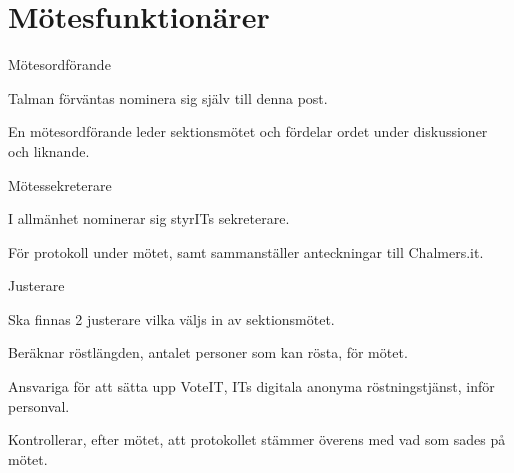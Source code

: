 \documentclass[11pt, noincludeaddress]{classes/cthit}
\let\tempone\itemize
\let\temptwo\enditemize
\renewenvironment{itemize}{\tempone\addtolength{\itemsep}{-0.3\baselineskip}}{\temptwo}
\begin{document}
\section{Mötesfunktionärer}
\begin{itemize}
    \item Mötesordförande
    \begin{itemize}
        \item Talman förväntas nominera sig själv till denna post.
        \item En mötesordförande leder sektionsmötet och fördelar ordet under diskussioner och liknande. 
    \end{itemize}
    \item Mötessekreterare
    \begin{itemize}
        \item I allmänhet nominerar sig styrITs sekreterare.
        \item För protokoll under mötet, samt sammanställer anteckningar till Chalmers.it.
    \end{itemize}
    \item Justerare
    \begin{itemize}
        \item Ska finnas 2 justerare vilka väljs in av sektionsmötet.
        \item Beräknar röstlängden, antalet personer som kan rösta, för mötet.
        \item Ansvariga för att sätta upp VoteIT, ITs digitala anonyma röstningstjänst, inför personval.
        \item Kontrollerar, efter mötet, att protokollet stämmer överens med vad som sades på mötet.
    \end{itemize}
\end{itemize}
\end{document}
